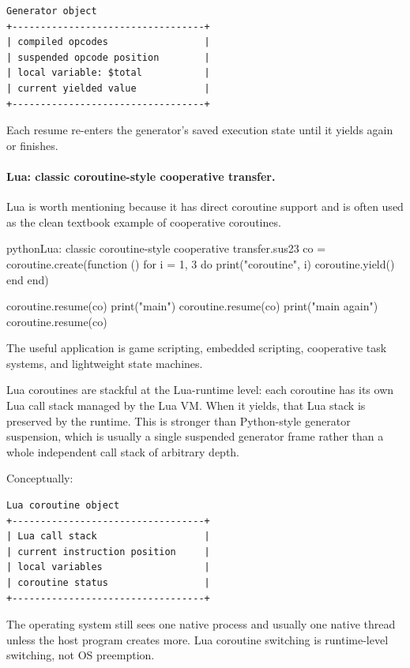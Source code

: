 \begin{verbatim}
Generator object
+----------------------------------+
| compiled opcodes                 |
| suspended opcode position        |
| local variable: $total           |
| current yielded value            |
+----------------------------------+
\end{verbatim}

Each resume re-enters the generator's saved execution state until it yields again or finishes.

\paragraph{Lua: classic coroutine-style cooperative transfer.}

Lua is worth mentioning because it has direct coroutine support and is often used as the clean textbook example of cooperative coroutines.

\begin{codebox}[]{python}{Lua: classic coroutine-style cooperative transfer.}{sus23}
co = coroutine.create(function ()
    for i = 1, 3 do
        print("coroutine", i)
        coroutine.yield()
    end
end)

coroutine.resume(co)
print("main")
coroutine.resume(co)
print("main again")
coroutine.resume(co)
\end{codebox}


The useful application is game scripting, embedded scripting, cooperative task systems, and lightweight state machines.

Lua coroutines are stackful at the Lua-runtime level: each coroutine has its own Lua call stack managed by the Lua VM. When it yields, that Lua stack is preserved by the runtime. This is stronger than Python-style generator suspension, which is usually a single suspended generator frame rather than a whole independent call stack of arbitrary depth.

Conceptually:

\begin{verbatim}
Lua coroutine object
+----------------------------------+
| Lua call stack                   |
| current instruction position     |
| local variables                  |
| coroutine status                 |
+----------------------------------+
\end{verbatim}

The operating system still sees one native process and usually one native thread unless the host program creates more. Lua coroutine switching is runtime-level switching, not OS preemption.

